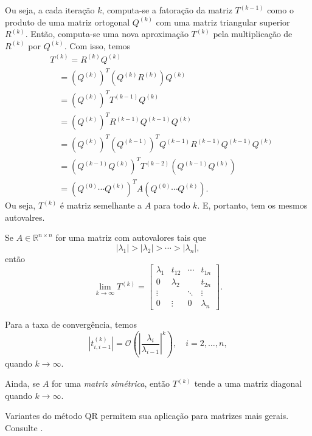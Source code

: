 Ou seja, a cada iteração $k$, computa-se a fatoração da matriz $T^{(k-1)}$ como o produto de uma matriz ortogonal $Q^{(k)}$ com uma matriz triangular superior $R^{(k)}$. Então, computa-se uma nova aproximação $T^{(k)}$ pela multiplicação de $R^{(k)}$ por $Q^{(k)}$. Com isso, temos
\begin{align}
  & T^{(k)} = R^{(k)}Q^{(k)}\\
  &\text{}\quad = (Q^{(k)})^T(Q^{(k)}R^{(k)})Q^{(k)}\\
  &\text{}\quad = (Q^{(k)})^TT^{(k-1)}Q^{(k)}\\
  &\text{}\quad = (Q^{(k)})^TR^{(k-1)}Q^{(k-1)}Q^{(k)}\\
  &\text{}\quad = (Q^{(k)})^T(Q^{(k-1)})^TQ^{(k-1)}R^{(k-1)}Q^{(k-1)}Q^{(k)}\\
  &\text{}\quad = (Q^{(k-1)}Q^{(k)})^TT^{(k-2)}(Q^{(k-1)}Q^{(k)})\\
  &\text{}\quad =(Q^{(0)}\cdots Q^{(k)})^TA(Q^{(0)}\cdots Q^{(k)}).
\end{align}
Ou seja, $T^{(k)}$ é matriz semelhante a $A$ para todo $k$. E, portanto, tem os mesmos autovalres.

\begin{obs}[\hl{Convergência}]
  Se $A\in\mathbb{R}^{n\times n}$ for uma matriz com autovalores tais que
  \begin{equation}
    |\lambda_1| > |\lambda_2| > \cdots > |\lambda_n|,
  \end{equation}
  então
  \begin{equation}
    \lim_{k\to\infty} T^{(k)} =   \begin{bmatrix}
    \lambda_1 & t_{12} & \cdots & t_{1n}\\
    0 & \lambda_2 & & t_{2n}\\
    \vdots & & \ddots & \vdots\\
    0 & \vdots & 0 & \lambda_n
  \end{bmatrix}.
\end{equation}

  Para a taxa de convergência, temos
  \begin{equation}
    |t^{(k)}_{i,i-1}| = \mathcal{O}\left(\left|\frac{\lambda_i}{\lambda_{i-1}}\right|^k\right),\quad i=2,\dotsc,n,
  \end{equation}
  quando $k\to\infty$.

  Ainda, se $A$ for uma \emph{matriz simétrica}, então $T^{(k)}$ tende a uma matriz diagonal quando $k\to\infty$.
\end{obs}

\begin{obs}
  Variantes do método QR permitem sua aplicação para matrizes mais gerais. Consulte \cite{Golub2013a}.
\end{obs}

